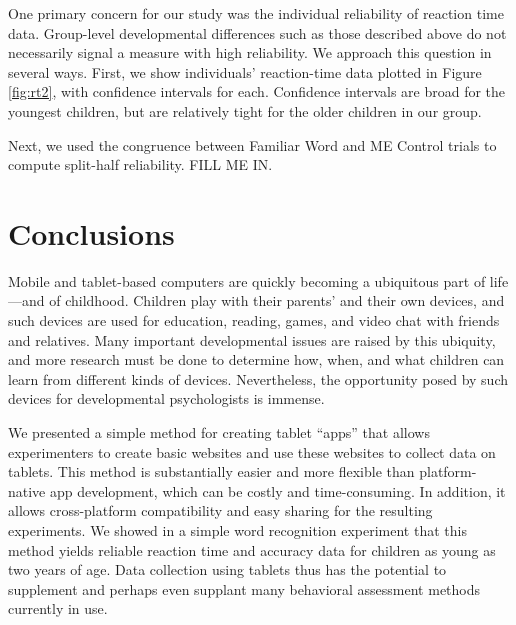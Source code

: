 \documentclass[man,noapacite]{apa2}
\begin{document}
One primary concern for our study was the individual reliability of reaction time data. Group-level developmental differences such as those described above do not necessarily signal a measure with high reliability. We approach this question in several ways. First, we show individuals' reaction-time data plotted in Figure \ref{fig:rt2}, with confidence intervals for each. Confidence intervals are broad for the youngest children, but are relatively tight for the older children in our group. 

Next, we used the congruence between Familiar Word and ME Control trials to compute split-half reliability. FILL ME IN. 

\section{Conclusions} 

Mobile and tablet-based computers are quickly becoming a ubiquitous part of life---and of childhood. Children play with their parents' and their own devices, and such devices are used for education, reading, games, and video chat with friends and relatives. Many important developmental issues are raised by this ubiquity, and more research must be done to determine how, when, and what children can learn from different kinds of devices. Nevertheless, the opportunity posed by such devices for developmental psychologists is immense.

We presented a simple method for creating tablet ``apps'' that allows experimenters to create basic websites and use these websites to collect data on tablets. This method is substantially easier and more flexible than platform-native app development, which can be costly and time-consuming. In addition, it allows cross-platform compatibility and easy sharing for the resulting experiments. We showed in a simple word recognition experiment that this method yields reliable reaction time and accuracy data for children as young as two years of age. Data collection using tablets thus has the potential to supplement and perhaps even supplant many behavioral assessment methods currently in use. 

\newpage



\end{document}
